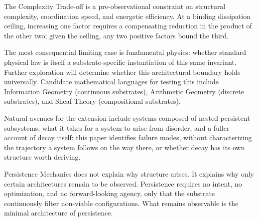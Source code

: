 The Complexity Trade-off is a pre-observational constraint on structural complexity, coordination speed, and energetic efficiency. At a binding dissipation ceiling, increasing one factor requires a compensating reduction in the product of the other two; given the ceiling, any two positive factors bound the third.

The most consequential limiting case is fundamental physics: whether standard physical law is itself a substrate-specific instantiation of this same invariant. Further exploration will determine whether this architectural boundary holds universally. Candidate mathematical languages for testing this include Information Geometry (continuous substrates), Arithmetic Geometry (discrete substrates), and Sheaf Theory (compositional substrates).

Natural avenues for the extension include systems composed of nested persistent subsystems, what it takes for a system to arise from disorder, and a fuller account of decay itself: this paper identifies failure modes, without characterizing the trajectory a system follows on the way there, or whether decay has its own structure worth deriving.

Persistence Mechanics does not explain why structure arises. It explains why only certain architectures remain to be observed. Persistence requires no intent, no optimization, and no forward-looking agency, only that the substrate continuously filter non-viable configurations. What remains observable is the minimal architecture of persistence.